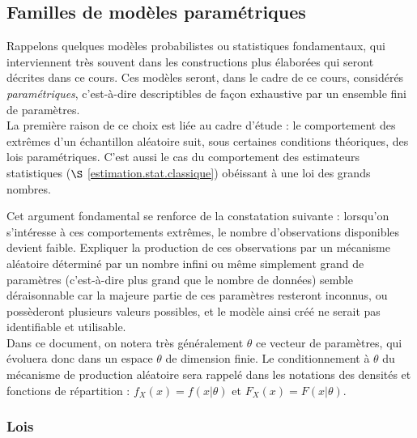 \subsection{Familles de mod\`eles param\'etriques}\label{lois}

Rappelons quelques mod\`eles probabilistes ou statistiques fondamentaux, qui interviennent tr\`es souvent dans les constructions plus \'elabor\'ees qui seront d\'ecrites dans ce cours. Ces mod\`eles seront, dans le cadre de ce cours, consid\'er\'es {\it param\'etriques}, c'est-\`a-dire descriptibles de fa\c con exhaustive par un ensemble fini de param\`etres.  \\

La premi\`ere raison de ce choix est li\'ee au cadre d'\'etude : le comportement des extr\^emes d'un \'echantillon al\'eatoire suit, sous certaines conditions th\'eoriques, des lois param\'etriques. C'est aussi le cas du comportement des estimateurs statistiques ($\S$ \ref{estimation.stat.classique}) ob\'eissant \`a une loi des grands nombres. 

Cet argument fondamental se renforce de la constatation suivante : lorsqu'on s'int\'eresse \`a ces comportements extr\^emes, le nombre d'observations disponibles devient faible. Expliquer la production de ces observations par un m\'ecanisme al\'eatoire d\'etermin\'e par un nombre infini %
ou m\^eme simplement grand de param\`etres (c'est-\`a-dire plus grand que le nombre de donn\'ees) semble d\'eraisonnable car la majeure partie de ces param\`etres resteront inconnus, ou poss\`ederont plusieurs valeurs possibles, et le mod\`ele ainsi cr\'e\'e ne serait pas identifiable et utilisable. \\

Dans ce document, on notera tr\`es g\'en\'eralement $\theta$ ce vecteur de param\`etres, qui \'evoluera donc dans un espace $\theta$ de dimension finie. Le conditionnement \`a $\theta$ du m\'ecanisme de production al\'eatoire sera rappel\'e dans les notations des densit\'es et fonctions de r\'epartition : $f_X(x)=f(x|\theta)$ et $F_X(x)=F(x|\theta)$.

\subsubsection*{Lois}\label{lois.para}

